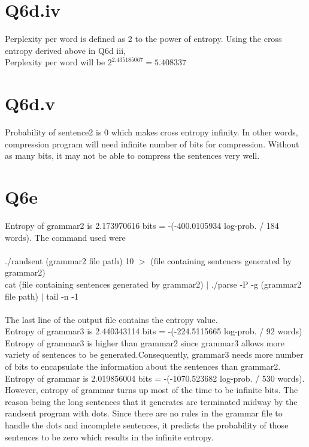\documentclass[12pt]{article}
\begin{document}
\section*{Q6d.iv}
Perplexity per word is defined as 2 to the power of entropy. Using the cross entropy derived above in Q6d iii, 
\\
Perplexity per word will be \(2^{2.435185067} = 5.408337\)\\
\section*{Q6d.v}
Probability of sentence2 is 0 which makes cross entropy infinity. In other words, compression program will need infinite number of bits for compression. Without as many bits, it may not be able to compress the sentences very well.\\
\pagebreak
\section*{Q6e}
Entropy of grammar2 is 2.173970616 bits = -(-400.0105934 log-prob. / 184 words). The command used were\\
\\
./randsent (grammar2 file path) 10 \(>\) (file containing sentences generated by grammar2)\\
cat (file containing sentences generated by grammar2) \(|\) ./parse -P -g (grammar2 file path) \(|\) tail -n -1\\
\\
The last line of the output file contains the entropy value.\\
Entropy of grammar3 is 2.440343114 bits = -(-224.5115665 log-prob. / 92 words)\\
Entropy of grammar3 is higher than grammar2 since grammar3 allows more variety of sentences to be generated.Consequently, grammar3 needs more number of bits to encapsulate the information about the sentences than grammar2.\\
Entropy of grammar is 2.019856004 bits = -(-1070.523682 log-prob. / 530 words). However, entropy of grammar turns up most of the time to be infinite bits. The reason being the long sentences that it generates are terminated midway by the randsent program with dots. Since there are no rules in the grammar file to handle the dots and incomplete sentences, it predicts the probability of those sentences to be zero which results in the infinite entropy.\\
\pagebreak
\end{document}
